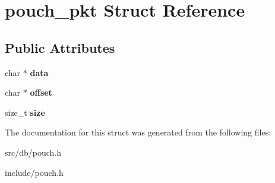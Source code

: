 \hypertarget{structpouch__pkt}{
\section{pouch\_\-pkt Struct Reference}
\label{structpouch__pkt}
}
\subsection*{Public Attributes}
\begin{DoxyCompactItemize}
\item 
\hypertarget{structpouch__pkt_afc486460f7445e388800d49a58db310b}{
char $\ast$ {\bfseries data}}
\label{structpouch__pkt_afc486460f7445e388800d49a58db310b}

\item 
\hypertarget{structpouch__pkt_a7cb75bafbdefff91daf089e0f4842047}{
char $\ast$ {\bfseries offset}}
\label{structpouch__pkt_a7cb75bafbdefff91daf089e0f4842047}

\item 
\hypertarget{structpouch__pkt_ad77e988de8c755607a21e988dabc2485}{
size\_\-t {\bfseries size}}
\label{structpouch__pkt_ad77e988de8c755607a21e988dabc2485}

\end{DoxyCompactItemize}


The documentation for this struct was generated from the following files:\begin{DoxyCompactItemize}
\item 
src/db/pouch.h\item 
include/pouch.h\end{DoxyCompactItemize}
